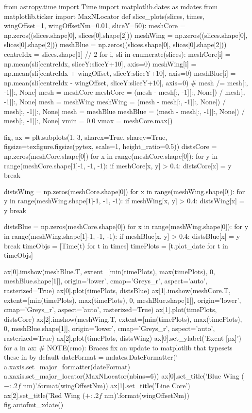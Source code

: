 \begin{pycode}[2DRT]
from astropy.time import Time
import matplotlib.dates as mdates
from matplotlib.ticker import MaxNLocator
def slice_plots(slices, times, wingOffset=1, wingOffsetNm=0.01, sliceY=50):
    meshCore = np.zeros((slices.shape[0], slices[0].shape[2]))
    meshWing = np.zeros((slices.shape[0], slices[0].shape[2]))
    meshBlue = np.zeros((slices.shape[0], slices[0].shape[2]))
    centreIdx = slices.shape[1] // 2
    for i, sli in enumerate(slices):
        meshCore[i] = np.mean(sli[centreIdx, sliceY:sliceY+10], axis=0)
        meshWing[i] = np.mean(sli[centreIdx + wingOffset, sliceY:sliceY+10], axis=0)
        meshBlue[i] = np.mean(sli[centreIdx - wingOffset, sliceY:sliceY+10], axis=0)
    # mesh /= mesh[:, -1][:, None]
    mesh = meshCore
    meshCore = (mesh - mesh[:, -1][:, None]) / mesh[:, -1][:, None]
    mesh = meshWing
    meshWing = (mesh - mesh[:, -1][:, None]) / mesh[:, -1][:, None]
    mesh = meshBlue
    meshBlue = (mesh - mesh[:, -1][:, None]) / mesh[:, -1][:, None]
    vmin = 0.0
    vmax = meshCore.max()

    fig, ax = plt.subplots(1, 3, sharex=True, sharey=True, figsize=texfigure.figsize(pytex, scale=1, height_ratio=0.5))
    distsCore = np.zeros(meshCore.shape[0])
    for x in range(meshCore.shape[0]):
        for y in range(meshCore.shape[1]-1, -1, -1):
            if meshCore[x, y] > 0.4:
                distsCore[x] = y
                break

    distsWing = np.zeros(meshCore.shape[0])
    for x in range(meshWing.shape[0]):
        for y in range(meshWing.shape[1]-1, -1, -1):
            if meshWing[x, y] > 0.4:
                distsWing[x] = y
                break

    distsBlue = np.zeros(meshCore.shape[0])
    for x in range(meshWing.shape[0]):
        for y in range(meshWing.shape[1]-1, -1, -1):
            if meshBlue[x, y] > 0.4:
                distsBlue[x] = y
                break
    timeObjs = [Time(t) for t in times]
    timePlots = [t.plot_date for t in timeObjs]

    ax[0].imshow(meshBlue.T,
                 extent=[min(timePlots), max(timePlots), 0, meshBlue.shape[1]],
                 origin='lower', cmap='Greys_r', aspect='auto', rasterized=True)
    ax[0].plot(timePlots, distsBlue)
    ax[1].imshow(meshCore.T,
                 extent=[min(timePlots), max(timePlots), 0, meshBlue.shape[1]],
                 origin='lower', cmap='Greys_r', aspect='auto', rasterized=True)
    ax[1].plot(timePlots, distsCore)
    ax[2].imshow(meshWing.T,
                 extent=[min(timePlots), max(timePlots), 0, meshBlue.shape[1]],
                 origin='lower', cmap='Greys_r', aspect='auto', rasterized=True)
    ax[2].plot(timePlots, distsWing)
    ax[0].set_ylabel('Exent [px]')
    for a in ax:
        # NOTE(cmo): Braces fix an update to matplotlib that typesets these in \displaystyle by default
        dateFormat = mdates.DateFormatter('%
        a.xaxis.set_major_formatter(dateFormat)
        a.xaxis.set_major_locator(MaxNLocator(nbins=6))
    ax[0].set_title('Blue Wing ($-{:.2f}$ nm)'.format(wingOffsetNm))
    ax[1].set_title('Line Core')
    ax[2].set_title('Red Wing ($+{:.2f}$ nm)'.format(wingOffsetNm))
    fig.autofmt_xdate()


\end{pycode}
